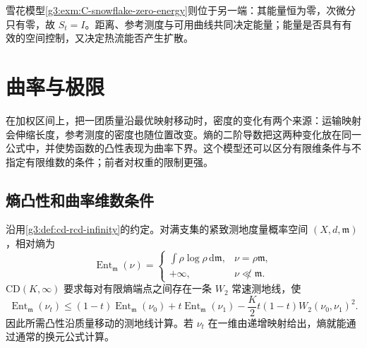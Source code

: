 雪花模型\cref{g3:exm:C-snowflake-zero-energy}则位于另一端：其能量恒为零，次微分只有零，故 \(S_t=I\)。距离、参考测度与可用曲线共同决定能量；能量是否具有有效的空间控制，又决定热流能否产生扩散。

\section{曲率与极限}
\label{g3:sec:C03}

在加权区间上，把一团质量沿最优映射移动时，密度的变化有两个来源：运输映射会伸缩长度，参考测度的密度也随位置改变。熵的二阶导数把这两种变化放在同一公式中，并使势函数的凸性表现为曲率下界。这个模型还可以区分有限维条件与不指定有限维数的条件；前者对权重的限制更强。

\subsection{熵凸性和曲率维数条件}
\label{g3:subsec:C03:01}

沿用\cref{g3:def:cd-rcd-infinity}的约定。对满支集的紧致测地度量概率空间 \((X,d,\mathfrak m)\)，相对熵为
\[
	\operatorname{Ent}_{\mathfrak m}(\nu)=
	\begin{cases}
		\displaystyle\int\rho\log\rho\,\mathrm d\mathfrak m,
		   &\nu=\rho\mathfrak m,\\
		+\infty,&\nu\not\ll\mathfrak m.
	\end{cases}
\]
\(\mathrm{CD}(K,\infty)\) 要求每对有限熵端点之间存在一条 \(W_2\) 常速测地线，使
\begin{equation}\label{g3:eq:C-entropy-curvature-inequality}
	\operatorname{Ent}_{\mathfrak m}(\nu_t)
	\le(1-t)\operatorname{Ent}_{\mathfrak m}(\nu_0)
	  +t\operatorname{Ent}_{\mathfrak m}(\nu_1)
	  -\frac K2t(1-t)W_2(\nu_0,\nu_1)^2.
\end{equation}
因此所需凸性沿质量移动的测地线计算。若 \(\nu_t\) 在一维由递增映射给出，熵就能通过通常的换元公式计算。

